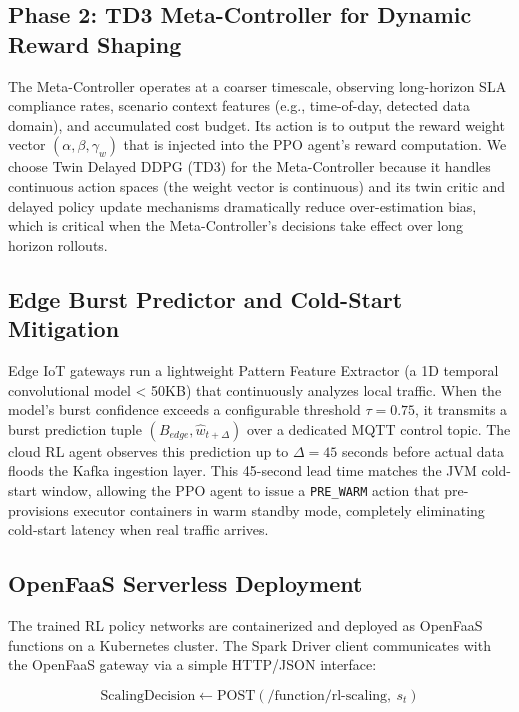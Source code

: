 \documentclass[10pt, conference, compsocconf]{IEEEtran}
\begin{document}
\subsection{Phase 2: TD3 Meta-Controller for Dynamic Reward Shaping}

The Meta-Controller operates at a coarser timescale, observing long-horizon SLA compliance rates, scenario context features (e.g., time-of-day, detected data domain), and accumulated cost budget. Its action is to output the reward weight vector $(\alpha, \beta, \gamma_w)$ that is injected into the PPO agent's reward computation. We choose Twin Delayed DDPG (TD3) \cite{fujimoto2018td3} for the Meta-Controller because it handles continuous action spaces (the weight vector is continuous) and its twin critic and delayed policy update mechanisms dramatically reduce over-estimation bias, which is critical when the Meta-Controller's decisions take effect over long horizon rollouts.

\subsection{Edge Burst Predictor and Cold-Start Mitigation}

Edge IoT gateways run a lightweight Pattern Feature Extractor (a 1D temporal convolutional model < 50KB) that continuously analyzes local traffic. When the model's burst confidence exceeds a configurable threshold $\tau = 0.75$, it transmits a burst prediction tuple $(B_{edge}, \hat{w}_{t+\Delta})$ over a dedicated MQTT control topic. The cloud RL agent observes this prediction up to $\Delta = 45$ seconds before actual data floods the Kafka ingestion layer. This 45-second lead time matches the JVM cold-start window, allowing the PPO agent to issue a \texttt{PRE\_WARM} action that pre-provisions executor containers in warm standby mode, completely eliminating cold-start latency when real traffic arrives.

\subsection{OpenFaaS Serverless Deployment}

The trained RL policy networks are containerized and deployed as OpenFaaS functions on a Kubernetes cluster. The Spark Driver client communicates with the OpenFaaS gateway via a simple HTTP/JSON interface:

\[
\text{ScalingDecision} \leftarrow \text{POST}(\text{/function/rl-scaling},\ s_t)
\]
\end{document}
